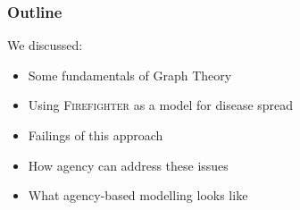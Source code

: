 \documentclass[unknownkeysallowed]{beamer}
\begin{document}
\begin{frame}
\frametitle{Outline}
\tableofcontents[currentsection]
\end{frame}


\begin{frame}

We discussed:

\begin{itemize}
	\pause
	\item Some fundamentals of Graph Theory
	\pause
	\item Using {\scshape Firefighter} as a model for disease spread
	\pause
	\item Failings of this approach
	\pause
	\item How agency can address these issues
	\pause
	\item What agency-based modelling looks like
\end{itemize}

\end{frame}

%
%
\end{document}
